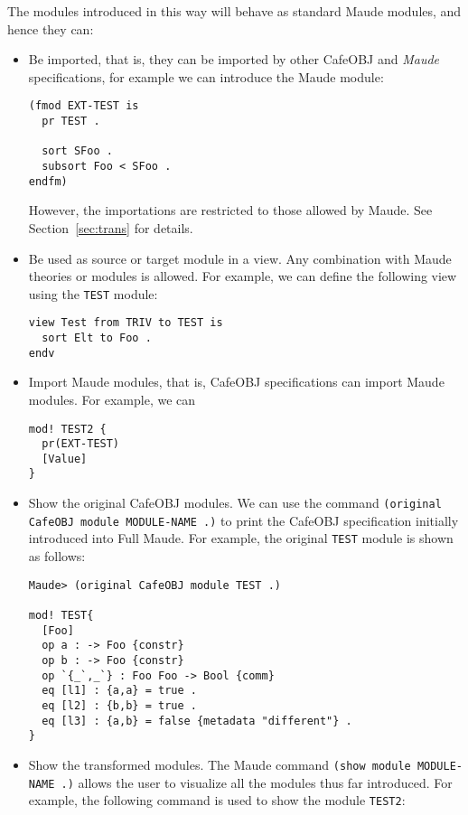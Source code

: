 The modules introduced in this way will behave as standard Maude modules, and hence
they can:
\begin{itemize}
\item
Be imported, that is, they can be imported by other CafeOBJ and \emph{Maude} specifications,
for example we can introduce the Maude module:

{\codesize
\begin{verbatim}
(fmod EXT-TEST is
  pr TEST .
  
  sort SFoo .
  subsort Foo < SFoo .
endfm)
\end{verbatim}
}

However, the importations are restricted to those allowed by Maude. See
Section~\ref{sec:trans} for details.

\item
Be used as source or target module in a view. Any combination with Maude
theories or modules is allowed. For example, we can define the following
view using the \verb"TEST" module:

{\codesize
\begin{verbatim}
view Test from TRIV to TEST is
  sort Elt to Foo .
endv
\end{verbatim}
}

\item
Import Maude modules, that is, CafeOBJ specifications can import Maude
modules. For example, we can 

{\codesize
\begin{verbatim}
mod! TEST2 {
  pr(EXT-TEST)
  [Value]
}
\end{verbatim}
}

\item
Show the original CafeOBJ modules. We can use the command
\texttt{(original CafeOBJ module MODULE-NAME .)} to print the CafeOBJ specification
initially introduced into Full Maude. For example, the original \verb"TEST" module
is shown as follows:

{\codesize
\begin{verbatim}
Maude> (original CafeOBJ module TEST .)

mod! TEST{
  [Foo]
  op a : -> Foo {constr}
  op b : -> Foo {constr}
  op `{_`,_`} : Foo Foo -> Bool {comm}
  eq [l1] : {a,a} = true .
  eq [l2] : {b,b} = true .
  eq [l3] : {a,b} = false {metadata "different"} .
}
\end{verbatim}
}

\item
Show the transformed modules. The Maude command \verb"(show module MODULE-NAME .)"
allows the user to visualize all the modules thus far introduced. For example, the
following command is used to show the module \verb"TEST2":


\end{itemize}
